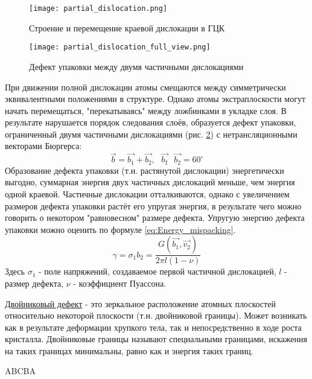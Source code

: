 \begin{figure}[h!]
\centering
\texttt{[image: partial\_dislocation.png]}\caption{Строение и перемещение краевой дислокации в ГЦК}\label{fig:partial_dislocation}
\end{figure} 
\begin{figure}[h!]
\centering
\texttt{[image: partial\_dislocation\_full\_view.png]}\caption{Дефект упаковки между двумя частичными дислокациями} \label{fig:partial_dislocation_full_view}
\end{figure} 
При движении полной дислокации атомы смещаются между симметрически эквивалентными положениями в структуре. Однако атомы экстраплоскости могут начать перемещаться, "перекатываясь" между ложбинками в укладке слоя. В результате нарушается порядок следования слоёв, образуется дефект упаковки, ограниченный двумя частичными дислокациями (рис. \ref{fig:partial_dislocation_full_view}) с нетрансляционными векторами Бюргерса:
\begin{equation}
  \vec{b}=\vec{b_1}+\vec{b_2}, \text{ }\vec{b_1}\widehat{  }\text{ }\vec{b_2} = 60^\circ
\label{eq:partial_dislocation} 
\end{equation}
Образование дефекта упаковки (т.н. растянутой дислокации) энергетически выгодно, суммарная энергия двух частичных дислокаций меньше, чем энергия одной краевой. Частичные дислокации отталкиваются, однако с увеличением размеров дефекта упаковки растёт его упругая энергия, в результате чего можно говорить о некотором "равновесном" размере дефекта. Упругую энергию дефекта упаковки можно оценить по формуле \ref{eq:Energy_mispacking}.
\begin{equation}
  \gamma = \sigma_1b_2= \frac{G(\vec{b_1},\vec{v_2})}{2\pi l (1-\nu)}
\label{eq:Energy_mispacking} 
\end{equation}
Здесь $\sigma_1$ - поле напряжений, создаваемое первой частичной дислокацией, $l$ - размер дефекта, $\nu$ - коэффициент Пуассона.
\par
\underline{Двойниковый дефект} - это зеркальное расположение атомных плоскостей относительно некоторой плоскости (т.н. двойниковой границы). Может возникать как в результате деформации хрупкого тела, так и непосредственно в ходе роста кристалла. Двойниковые границы называют специальными границами, искажения на таких границах минимальны, равно как и энергия таких границ.
\par ABCBA
